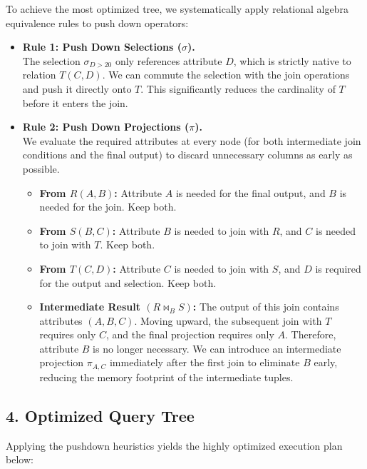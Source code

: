 \documentclass[12pt,a3paper]{article}
\begin{document}
\begin{enumerate}
\begin{tcolorbox}[enhanced,breakable,ansbox,colback=cD!4,colframe=cD,boxrule=0.8pt,arc=5pt,title={\textbf{Answer}},fonttitle=\bfseries\color{white},colbacktitle=cD]
To achieve the most optimized tree, we systematically apply relational algebra equivalence rules to push down operators:

\begin{itemize}
    \item \textbf{Rule 1: Push Down Selections ($\sigma$).} \\
    The selection $\sigma_{D > 20}$ only references attribute $D$, which is strictly native to relation $T(C, D)$. We can commute the selection with the join operations and push it directly onto $T$. This significantly reduces the cardinality of $T$ before it enters the join.
    
    \item \textbf{Rule 2: Push Down Projections ($\pi$).} \\
    We evaluate the required attributes at every node (for both intermediate join conditions and the final output) to discard unnecessary columns as early as possible.
    \begin{itemize}
        \item \textbf{From $R(A, B)$:} Attribute $A$ is needed for the final output, and $B$ is needed for the join. Keep both.
        \item \textbf{From $S(B, C)$:} Attribute $B$ is needed to join with $R$, and $C$ is needed to join with $T$. Keep both.
        \item \textbf{From $T(C, D)$:} Attribute $C$ is needed to join with $S$, and $D$ is required for the output and selection. Keep both.
        \item \textbf{Intermediate Result $(R \bowtie_{B} S)$:} The output of this join contains attributes $(A, B, C)$. Moving upward, the subsequent join with $T$ requires only $C$, and the final projection requires only $A$. Therefore, attribute $B$ is no longer necessary. We can introduce an intermediate projection $\pi_{A, C}$ immediately after the first join to eliminate $B$ early, reducing the memory footprint of the intermediate tuples.
    \end{itemize}
\end{itemize}

\subsection*{4. Optimized Query Tree}

Applying the pushdown heuristics yields the highly optimized execution plan below:


\end{tcolorbox}
\end{enumerate}
\end{document}
